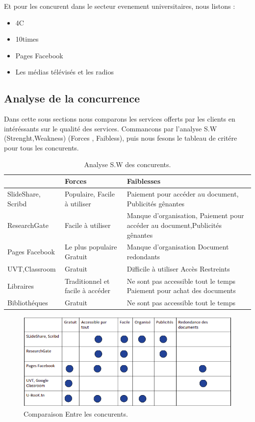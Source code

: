 \documentclass[12pt]{report}
\begin{document}
Et pour les concurent dans le secteur evenement universitaires, nous listons :
\begin{itemize}
\item 4C
\item 10times
\item Pages Facebook
\item Les médias télévisés et les radios
\end{itemize}

\subsection{Analyse de la concurrence}

Dans cette sous sections nous comparons les services offerts par les clients en intéréssants sur le qualité des services. Commancons par l'analyse S.W (Strenght,Weakness) (Forces , Faibless), puis nous fesons le tableau de critére pour tous les concurents.

\begin{table}[h!]
\begin{center}
\begin{tabular}{ | m{4cm} | m{4cm}| m{4cm} |} 
 \hline
   & Forces & Faiblesses \\ 
 \hline
 SlideShare, Scribd & Populaire, Facile à utiliser & Paiement pour accéder au
  document, Publicités gênantes \\ 
 \hline
 ResearchGate & Facile à utiliser & Manque d’organisation, Paiement pour accéder au document,Publicités gênantes \\ 
 \hline
 Pages Facebook & Le plus populaire Gratuit & Manque d’organisation Document redondants \\ 
 \hline
 UVT,Classroom & Gratuit & Difficile à utiliser Accès Restreints \\ 
 \hline
 Libraires & Traditionnel et facile à accéder & Ne sont pas accessible tout le temps Paiement pour achat des documents \\ 
 \hline
 Bibliothéques & Gratuit & Ne sont pas accessible tout le temps \\ 
 \hline
\end{tabular}
\caption{Analyse S.W des concurents.}
\label{table:1}
\end{center}
\end{table}

\begin{figure}[h]
    \centering
    \includegraphics[width=1\textwidth]{concur}
    \caption{Comparaison Entre les concurents.}
\end{figure}
\end{document}
